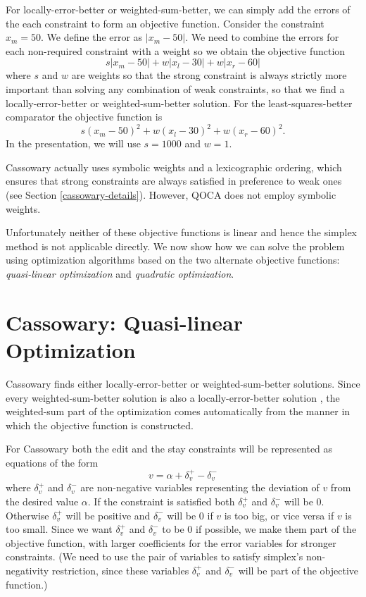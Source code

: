 \documentclass{article}
\begin{document}
For locally-error-better or weighted-sum-better, we can
simply add the errors of the each constraint to form an objective function.
Consider the constraint $x_m = 50$.  We define the error as $|x_m-50|$\@.  We
need to combine the errors for each non-required constraint with a weight
so we obtain the objective function 
$$s |x_m - 50| + w |x_l - 30| + w |x_r - 60|$$
where $s$ and $w$ are weights so that the strong constraint is always
strictly more important than solving any combination of weak constraints,
so that we find a locally-error-better or weighted-sum-better solution.
For the least-squares-better comparator the objective function is 
$$s (x_m - 50)^2 + w (x_l - 30)^2 + w (x_r - 60)^2.$$  
In the presentation, we will use $s = 1000$ and $w = 1$.

Cassowary actually uses symbolic weights and a lexicographic ordering,
which ensures that strong constraints are always satisfied in preference to
weak ones (see Section \ref{cassowary-details}).  However, QOCA 
does not employ symbolic weights.

Unfortunately neither of these objective functions is linear and hence the
simplex method is not applicable directly.  We now show how we can 
solve the problem using optimization algorithms
based on the two alternate objective functions: \emph{quasi-linear
optimization} and \emph{quadratic optimization}.

\section{Cassowary: Quasi-linear Optimization}
\label{quasi-linear}

Cassowary finds either locally-error-better or weighted-sum-better
solutions.  Since every weighted-sum-better solution is also a
locally-error-better solution \cite{borning-lisp-symbolic-computation-92},
the weighted-sum part of the optimization comes automatically from the
manner in which the objective function is constructed.

For Cassowary
both the edit and the stay constraints will be represented as equations of
the form  
$$v = \alpha + \delta_v^{+} - \delta_v^{-}$$
where $\delta_v^{+}$ and $\delta_v^{-}$ are non-negative variables
representing the
deviation of $v$ from the desired value $\alpha$.  If the constraint is
satisfied both $\delta_v^{+}$ and $\delta_v^{-}$ will be 0.  
Otherwise $\delta_v^{+}$ will be
positive and $\delta_v^{-}$ will be 0 if $v$ is too big, 
or vice versa if $v$ is
too small.  
Since we want $\delta_v^{+}$ and $\delta_v^{-}$ to be 0 if
possible, we make them part of the objective function, with larger
coefficients for the error variables for stronger constraints.
(We need to use the pair of variables to satisfy simplex's
non-negativity restriction, since these variables  $\delta_v^{+}$ and
$\delta_v^{-}$ will be part of the objective function.)  
\end{document}
